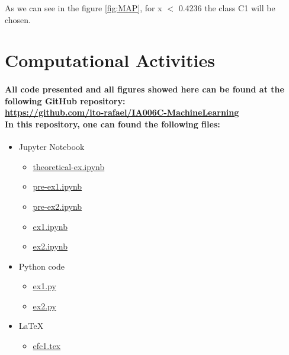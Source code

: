 \documentclass[a4paper]{article}
\begin{document}
As we can see in the figure \ref{fig:MAP}, for x $<$ 0.4236 the class C1 will be chosen.
\newpage

\section{Computational Activities}

\paragraph{
All code presented and all figures showed here can be found at the following GitHub repository:\\
\url{https://github.com/ito-rafael/IA006C-MachineLearning}\\
In this repository, one can found the following files:\\
}

\begin{itemize}
    \item Jupyter Notebook
    \begin{itemize}
        \item \href{https://github.com/ito-rafael/IA006C-MachineLearning/blob/master/efc1/theoretical-ex.ipynb}{theoretical-ex.ipynb}
        \item \href{https://github.com/ito-rafael/IA006C-MachineLearning/blob/master/efc1/pre-ex1.ipynb}{pre-ex1.ipynb}
        \item \href{https://github.com/ito-rafael/IA006C-MachineLearning/blob/master/efc1/pre-ex2.ipynb}{pre-ex2.ipynb}
        \item \href{https://github.com/ito-rafael/IA006C-MachineLearning/blob/master/efc1/ex1.ipynb}{ex1.ipynb}
        \item \href{https://github.com/ito-rafael/IA006C-MachineLearning/blob/master/efc1/ex2.ipynb}{ex2.ipynb}
    \end{itemize}
    \item Python code
    \begin{itemize}
        \item \href{https://github.com/ito-rafael/IA006C-MachineLearning/blob/master/efc1/ex1.py}{ex1.py}
        \item \href{https://github.com/ito-rafael/IA006C-MachineLearning/blob/master/efc1/ex2.py}{ex2.py}
    \end{itemize}
    \item \LaTeX
    \begin{itemize}
        \item \href{https://github.com/ito-rafael/IA006C-MachineLearning/blob/master/efc1/LaTeX/efc1.tex}{efc1.tex}
    \end{itemize}
\end{itemize}
\end{document}

